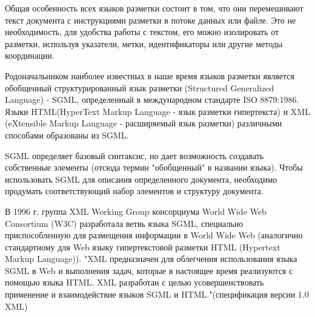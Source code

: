 \documentclass[12pt,a4paper,oneside]{article} %
\begin{document}
Общая особенность всех языков разметки состоит в том, что они \linebreak
перемешивают текст документа с инструкциями разметки в потоке \linebreak
данных или файле. Это не необходимость, для удобства работы с текстом, \linebreak
его можно изолировать от разметки, используя указатели, метки, \linebreak
идентификаторы или другие методы координации.

Родоначальником наиболее известных в наше время языков разметки \linebreak
является обобщенный структурированный язык разметки (Structured \linebreak
Generalized Language) - SGML, определенный в международном стандарте \linebreak
ISO 8879:1986. Языки HTML(HyperText Markup Language - язык разметки \linebreak
гипертекста) и XML (eXtensible Markup Language - расширяемый язык \linebreak
разметки) различными способами образованы из SGML.

SGML определяет базовый синтаксис, но дает возможность создавать \linebreak
собственные элементы (отсюда термин "обобщенный" в названии языка).\linebreak
Чтобы использовать SGML для описания определенного документа, \linebreak
необходимо продумать соответствующий набор элементов и структуру \linebreak
документа.

В 1996 г. группа XML Working Group консорциума World Wide Web \linebreak
Consortium (W3C) разработала ветвь языка SGML, специально \linebreak
приспособленную для размещения информации в World Wide Web \linebreak
(аналогично стандартному для Web языку гипертекстовой разметки HTML\linebreak
(Hypertext Markup Language)). "XML предназначен для облегчения \linebreak
использования языка SGML в Web и выполнения задач, которые в \linebreak
настоящее время реализуются с помощью языка HTML. XML разработан \linebreak
с целью усовершенствовать применение и взаимодействие языков \linebreak
SGML и HTML."(спецификация версии 1.0 XML)
\end{document}
